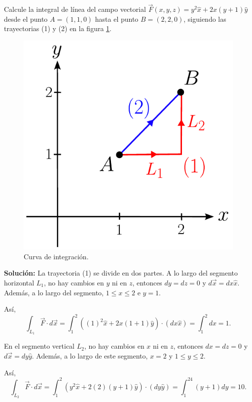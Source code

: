 \begin{ejemplo}
    Calcule la integral de línea del campo vectorial $\Vec{F}(x,y,z) = y^2 \hat{x} + 2x(y+1) \hat{y}$ desde el punto $A = (1,1,0)$ hasta el punto $B = (2,2,0)$, siguiendo las trayectorias (1) y (2) en la figura \ref{fig:Ej_Int_Linea}.

    \begin{figure}[H]
        \centering
        \includegraphics[scale = 0.55]{Figuras/Ej-Integral-Linea.pdf}
        \caption{Curva de integración.}
        \label{fig:Ej_Int_Linea}
    \end{figure}

    \textbf{Solución:} La trayectoria (1) se divide en dos partes. A lo largo del segmento horizontal $L_1$, no hay cambios en $y$ ni en $z$, entonces $dy = dz = 0$ y $d\Vec{x} = dx \hat{x}$. Además, a lo largo del segmento, $1 \leq x \leq 2$ e $y = 1$.

    Así,
    $$\int_{L_1} \Vec{F} \cdot d \Vec{x} = \int_1^2 ((1)^2 \hat{x} + 2x(1+1) \hat{y}) \cdot (dx \hat{x}) = \int_1^2 dx = 1.$$

    En el segmento vertical $L_2$, no hay cambios en $x$ ni en $z$, entonces $dx = dz = 0$ y $d\Vec{x} = dy \hat{y}$. Además, a lo largo de este segmento, $x = 2$ y $1 \leq y \leq 2$.

    Así,
    $$\int_{L_2} \Vec{F} \cdot d \Vec{x} = \int_1^2 (y^2 \hat{x} + 2(2)(y+1) \hat{y}) \cdot (dy \hat{y}) = \int_1^24(y+1) dy = 10.$$


\end{ejemplo}

